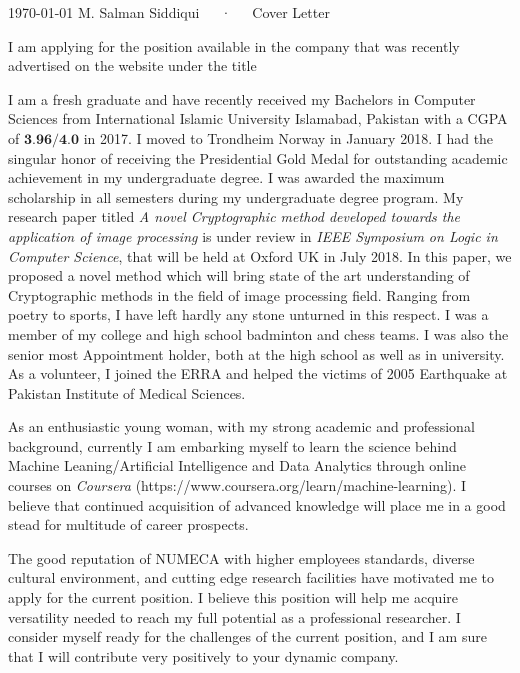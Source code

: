 \documentclass[11pt, a4paper]{awesome-cv}
\begin{document}
	
	\makecvheader
	
	\makecvfooter
	{\today}
	{M. Salman Siddiqui~~~·~~~Cover Letter}
	{}
	
	\makelettertitle
	
	\begin{cvletter}
		
		
		I am applying for the position available in the company that was recently advertised on the website under the title 
		
		I am a fresh graduate and have recently received my Bachelors in Computer Sciences from International Islamic University Islamabad, Pakistan with a CGPA of $\textbf{3.96/4.0}$ in 2017. I moved to Trondheim Norway in January 2018. 
 I had the singular honor of receiving the Presidential Gold Medal for outstanding academic achievement in my undergraduate degree. I was awarded the maximum scholarship in all semesters during my undergraduate degree program.	My research paper titled \emph{A novel Cryptographic method developed towards the application of image processing} is under review in \emph{IEEE Symposium on Logic in Computer Science}, that will be held at Oxford UK in July 2018. In this paper, we proposed a novel method which will bring state of the art understanding of Cryptographic methods in the field of image processing field.  Ranging from poetry to sports, I have left hardly any stone unturned in this respect. I was a member of my college and high school badminton and chess teams. I was also the senior most Appointment holder, both at the high school as well as in university. As a volunteer, I joined the ERRA and helped the victims of 2005 Earthquake at Pakistan Institute of Medical Sciences.
 
 As an enthusiastic young woman, with my strong academic and professional background, currently I am embarking myself to learn the science behind Machine Leaning/Artificial Intelligence and Data Analytics through online courses on \emph{Coursera} (https://www.coursera.org/learn/machine-learning). I believe that continued acquisition of advanced knowledge will place me in a good stead for  multitude of career prospects. 

	  
The good reputation of NUMECA with higher employees standards, diverse cultural environment, and cutting edge research facilities have motivated me to apply for the current position. I believe this position will help me acquire versatility needed to reach my full potential as a professional researcher. I consider myself ready for the challenges of the current position, and I am sure that I will contribute very positively to your dynamic company.
	\end{cvletter}
	
	
	\makeletterclosing
	
\end{document}
